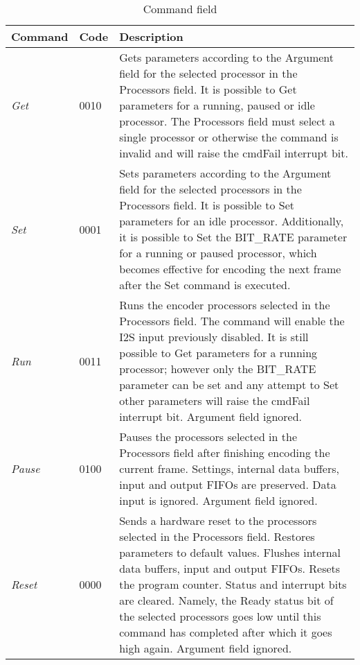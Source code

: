 \documentclass{rep}
\theoremstyle{plain}
\begin{document}
\begin{table}[H]
  \begin{center}
    \begin{tabular}{|l|l|p{12cm}|}
      \hline
      \rowcolor{iob-green}
      \textbf{Command} & \textbf{Code} & \textbf{Description} \\
      \hline
      \hline

      \textit{Get} & 0010 & Gets parameters according to the Argument field for
      the selected processor in the Processors field. It is possible to Get
      parameters for a running, paused or idle processor. The Processors field
      must select a single processor or otherwise the command is invalid and
      will raise the cmdFail interrupt bit.\\ \hline
      \rowcolor{iob-blue} \textit{Set} & 0001 & Sets parameters according to the
      Argument field for the selected processors in the Processors field. It is
      possible to Set parameters for an idle processor. Additionally, it is
      possible to Set the BIT\_RATE parameter for a running or paused processor,
      which becomes effective for encoding the next frame after the Set command
      is executed.\\ \hline

      \textit{Run} & 0011 & Runs the encoder processors selected in the
      Processors field. The command will enable the I2S input previously
      disabled. It is still possible to Get parameters for a running processor;
      however only the BIT\_RATE parameter can be set and any attempt to Set
      other parameters will raise the cmdFail interrupt bit. Argument
      field ignored.\\ \hline

      \rowcolor{iob-blue} \textit{Pause} & 0100 & Pauses the processors selected
      in the Processors field after finishing encoding the current
      frame. Settings, internal data buffers, input and output FIFOs are
      preserved. Data input is ignored. Argument field ignored.\\ \hline

      \textit{Reset} & 0000 & Sends a hardware reset to the processors selected
      in the Processors field. Restores parameters to default values. Flushes
      internal data buffers, input and output FIFOs. Resets the program
      counter. Status and interrupt bits are cleared. Namely, the Ready status
      bit of the selected processors goes low until this command has completed
      after which it goes high again. Argument field ignored.\\ \hline

    \end{tabular}
    \caption{Command field}
    \label{tab:spi-cmd}
  \end{center}
\end{table}
\end{document}
